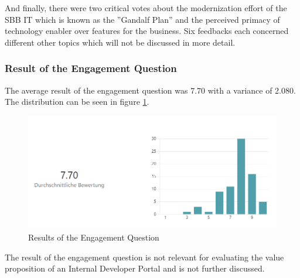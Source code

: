 \documentclass[a4paper,12pt]{article}
\begin{document}
    And finally, there were two critical votes about the modernization effort of the SBB IT which is known as the
    ''Gandalf Plan'' and the perceived primacy of technology enabler over features for the business.
    Six feedbacks each concerned different other topics which will not be discussed in more detail.

    \subsubsection{Result of the Engagement Question}
    \label{sssec:rengque}
    The average result of the engagement question was 7.70 with a variance of 2.080.
    The distribution can be seen in figure \ref{fig:engque}.
    \begin{figure}
        \includegraphics[width=\linewidth]{engagement.PNG}
        \caption{Results of the Engagement Question}
        \label{fig:engque}
    \end{figure}
    The result of the engagement question is not relevant for evaluating the value proposition of an
    Internal Developer Portal and is not further discussed.
\end{document}

